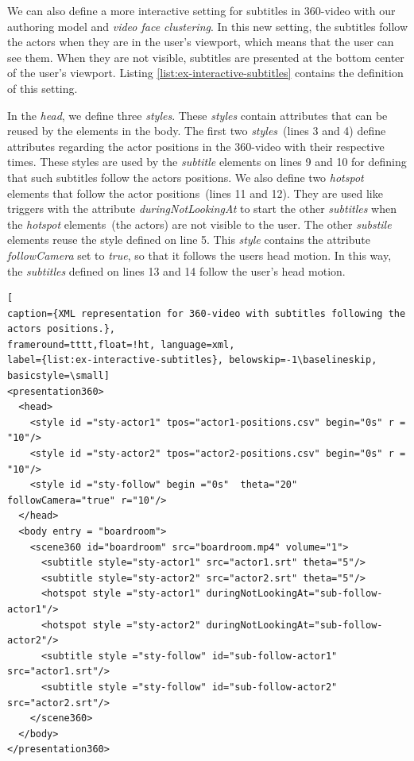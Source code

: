 We can also define a more interactive setting for subtitles in 360-video with our authoring model and \emph{video face clustering}. In this new setting, the subtitles follow the actors when they are in the user's viewport, which means that the user can see them. When they are not visible, subtitles are presented at the bottom center of the user's viewport. Listing \ref{list:ex-interactive-subtitles} contains the definition of this setting. 

In the \emph{head}, we define three \emph{styles}. These \emph{styles} contain attributes that can be reused by the elements in the body. The first two \emph{styles}~(lines 3 and 4) define attributes regarding the actor positions in the 360-video with their respective times. These styles are used by the \emph{subtitle} elements on lines 9 and 10 for defining that such subtitles follow the actors positions. We also define two \emph{hotspot} elements that follow the actor positions~(lines 11 and 12). They are used like triggers with the attribute \emph{duringNotLookingAt} to start the other \emph{subtitles} when the \emph{hotspot} elements~(the actors) are not visible to the user. The other \emph{substile} elements reuse the style defined on line 5. This \emph{style} contains the attribute \emph{followCamera} set to \emph{true}, so that it follows the users head motion. In this way, the \emph{subtitles} defined on lines 13 and 14 follow the user's head motion.


\begin{lstlisting}[
caption={XML representation for 360-video with subtitles following the actors positions.},
frameround=tttt,float=!ht, language=xml, 
label={list:ex-interactive-subtitles}, belowskip=-1\baselineskip, basicstyle=\small]
<presentation360>
  <head>
    <style id ="sty-actor1" tpos="actor1-positions.csv" begin="0s" r = "10"/>
    <style id ="sty-actor2" tpos="actor2-positions.csv" begin="0s" r = "10"/>
    <style id ="sty-follow" begin ="0s"  theta="20" followCamera="true" r="10"/>
  </head>
  <body entry = "boardroom">
    <scene360 id="boardroom" src="boardroom.mp4" volume="1">      
      <subtitle style="sty-actor1" src="actor1.srt" theta="5"/>      
      <subtitle style="sty-actor2" src="actor2.srt" theta="5"/>
      <hotspot style ="sty-actor1" duringNotLookingAt="sub-follow-actor1"/>
      <hotspot style ="sty-actor2" duringNotLookingAt="sub-follow-actor2"/>
      <subtitle style ="sty-follow" id="sub-follow-actor1" src="actor1.srt"/>
      <subtitle style ="sty-follow" id="sub-follow-actor2" src="actor2.srt"/>
    </scene360>
  </body>
</presentation360>
\end{lstlisting}

